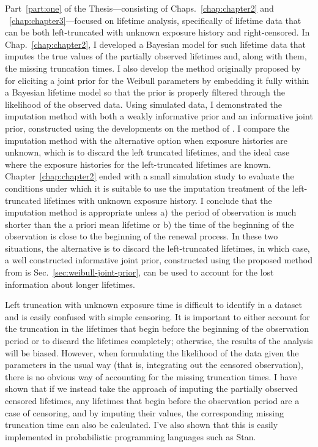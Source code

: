 Part~\ref{part:one} of the Thesis---consisting of Chaps.~\ref{chap:chapter2} and ~\ref{chap:chapter3}---focused on lifetime analysis, specifically of lifetime data that can be both left-truncated with unknown exposure history and right-censored. In Chap.~\ref{chap:chapter2}, I developed a Bayesian model for such lifetime data that imputes the true values of the partially observed lifetimes and, along with them, the missing truncation times. I also develop the method originally proposed by \citet{kaminskiy2005} for eliciting a joint prior for the Weibull parameters by embedding it fully within a Bayesian lifetime model so that the prior is properly filtered through the likelihood of the observed data. Using simulated data, I demonstrated the imputation method with both a weakly informative prior and an informative joint prior, constructed using the developments on the method of \citet{kaminskiy2005}. I compare the imputation method with the alternative option when exposure histories are unknown, which is to discard the left truncated lifetimes, and the ideal case where the exposure histories for the left-truncated lifetimes are known. Chapter~\ref{chap:chapter2} ended with a small simulation study to evaluate the conditions under which it is suitable to use the imputation treatment of the left-truncated lifetimes with unknown exposure history. I conclude that the imputation method is appropriate unless a) the period of observation is much shorter than the a priori mean lifetime or b) the time of the beginning of the observation is close to the beginning of the renewal process. In these two situations, the alternative is to discard the left-truncated lifetimes, in which case, a well constructed informative joint prior, constructed using the proposed method from is Sec.~\ref{sec:weibull-joint-prior}, can be used to account for the lost information about longer lifetimes.

Left truncation with unknown exposure time is difficult to identify in a dataset and is easily confused with simple censoring. It is important to either account for the truncation in the lifetimes that begin before the beginning of the observation period or to discard the lifetimes completely; otherwise, the results of the analysis will be biased. However, when formulating the likelihood of the data given the parameters in the usual way (that is, integrating out the censored observation), there is no obvious way of accounting for the missing truncation times. I have shown that if we instead take the approach of imputing the partially observed censored lifetimes, any lifetimes that begin before the observation period are a case of censoring, and by imputing their values, the corresponding missing truncation time can also be calculated. I've also shown that this is easily implemented in probabilistic programming languages such as Stan.

